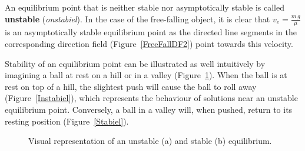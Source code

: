 An equilibrium point that is neither stable nor asymptotically stable is called \textbf{unstable} (\textit{onstabiel}). In the case of the free-falling object, it is clear that $v_e=\frac{m\,g}{\mu}$ is an asymptotically stable equilibrium point as the directed line segments in the corresponding direction field (Figure~\ref{FreeFallDF2}) point towards this velocity. 

Stability of an equilibrium point can be illustrated as well intuitively by imagining a ball at rest on a hill or in a valley (Figure~\ref{ballStability}). When the ball is at rest on top of a hill, the slightest push will cause the ball to roll away (Figure~\ref{Instabiel}), which represents the behaviour of solutions near an unstable equilibrium point. Conversely, a ball in a valley will, when pushed, return to its resting position (Figure~\ref{Stabiel}).

\begin{figure}[H]
\centering
\centerline{
\hspace{1cm}
}
\caption{Visual representation of an unstable (a) and stable (b) equilibrium.}\label{ballStability} 

\end{figure}


